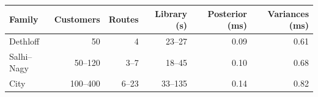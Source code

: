 \begin{tabular}{lrrrrr}
\toprule
Family & Customers & Routes & Library (s) & Posterior (ms) & Variances (ms) \\
\midrule
Dethloff & 50 & 4 & 23--27 & 0.09 & 0.61 \\
Salhi--Nagy & 50--120 & 3--7 & 18--45 & 0.10 & 0.68 \\
City & 100--400 & 6--23 & 33--135 & 0.14 & 0.82 \\
\bottomrule
\end{tabular}
